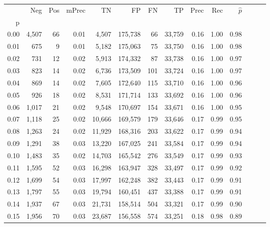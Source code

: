 \begin{tabular}{rrrrrrrrrrrrrr}
\toprule
{} &    Neg &  Pos & mPrec &       TN &       FP &      FN &      TP &  Prec &   Rec & $\hat{p}$ \\
p    &        &      &       &          &          &         &         &       &       &           \\
\midrule
0.00 &  4,507 &   66 &  0.01 &    4,507 &  175,738 &      66 &  33,759 &  0.16 &  1.00 &      0.98 \\
0.01 &    675 &    9 &  0.01 &    5,182 &  175,063 &      75 &  33,750 &  0.16 &  1.00 &      0.98 \\
0.02 &    731 &   12 &  0.02 &    5,913 &  174,332 &      87 &  33,738 &  0.16 &  1.00 &      0.97 \\
0.03 &    823 &   14 &  0.02 &    6,736 &  173,509 &     101 &  33,724 &  0.16 &  1.00 &      0.97 \\
0.04 &    869 &   14 &  0.02 &    7,605 &  172,640 &     115 &  33,710 &  0.16 &  1.00 &      0.96 \\
0.05 &    926 &   18 &  0.02 &    8,531 &  171,714 &     133 &  33,692 &  0.16 &  1.00 &      0.96 \\
0.06 &  1,017 &   21 &  0.02 &    9,548 &  170,697 &     154 &  33,671 &  0.16 &  1.00 &      0.95 \\
0.07 &  1,118 &   25 &  0.02 &   10,666 &  169,579 &     179 &  33,646 &  0.17 &  0.99 &      0.95 \\
0.08 &  1,263 &   24 &  0.02 &   11,929 &  168,316 &     203 &  33,622 &  0.17 &  0.99 &      0.94 \\
0.09 &  1,291 &   38 &  0.03 &   13,220 &  167,025 &     241 &  33,584 &  0.17 &  0.99 &      0.94 \\
0.10 &  1,483 &   35 &  0.02 &   14,703 &  165,542 &     276 &  33,549 &  0.17 &  0.99 &      0.93 \\
0.11 &  1,595 &   52 &  0.03 &   16,298 &  163,947 &     328 &  33,497 &  0.17 &  0.99 &      0.92 \\
0.12 &  1,699 &   54 &  0.03 &   17,997 &  162,248 &     382 &  33,443 &  0.17 &  0.99 &      0.91 \\
0.13 &  1,797 &   55 &  0.03 &   19,794 &  160,451 &     437 &  33,388 &  0.17 &  0.99 &      0.91 \\
0.14 &  1,937 &   67 &  0.03 &   21,731 &  158,514 &     504 &  33,321 &  0.17 &  0.99 &      0.90 \\
0.15 &  1,956 &   70 &  0.03 &   23,687 &  156,558 &     574 &  33,251 &  0.18 &  0.98 &      0.89 \\

\end{tabular}
